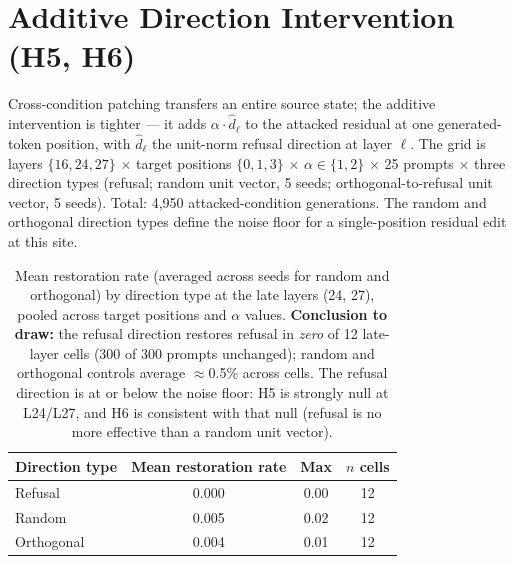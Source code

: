 \documentclass{article}
\begin{document}
\FloatBarrier

\section{Additive Direction Intervention (H5, H6)}
\label{sec:additive}

Cross-condition patching transfers an entire source state; the additive
intervention is tighter --- it adds $\alpha\cdot\hat{d}_\ell$ to the
attacked residual at one generated-token position, with $\hat{d}_\ell$ the
unit-norm refusal direction at layer $\ell$. The grid is layers
$\{16, 24, 27\}$ $\times$ target positions $\{0, 1, 3\}$ $\times$
$\alpha\in\{1, 2\}$ $\times$ 25 prompts $\times$ three direction types
(refusal; random unit vector, 5 seeds; orthogonal-to-refusal unit vector,
5 seeds). Total: 4{,}950 attacked-condition generations. The random and
orthogonal direction types define the noise floor for a single-position
residual edit at this site.

\begin{table}[h]
\centering
\small
\caption{Mean restoration rate (averaged across seeds for random and
orthogonal) by direction type at the late layers (24, 27), pooled across
target positions and $\alpha$ values.
\textbf{Conclusion to draw:} the refusal direction restores refusal in
\emph{zero} of 12 late-layer cells (300 of 300 prompts unchanged); random
and orthogonal controls average $\approx$0.5\% across cells. The refusal
direction is at or below the noise floor: H5 is strongly null at L24/L27,
and H6 is consistent with that null (refusal is no more effective than a
random unit vector).}
\label{tab:additive-by-type}
\begin{tabular}{lccc}
\toprule
Direction type & Mean restoration rate & Max & $n$ cells \\
\midrule
Refusal    & 0.000 & 0.00 & 12 \\
Random     & 0.005 & 0.02 & 12 \\
Orthogonal & 0.004 & 0.01 & 12 \\
\bottomrule
\end{tabular}
\end{table}
\end{document}
